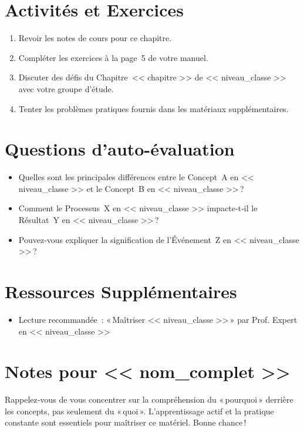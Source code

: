 \documentclass{article}
\begin{document}
	\section*{Activités et Exercices}
	\begin{enumerate}
		\item Revoir les notes de cours pour ce chapitre.
		\item Compléter les exercices à la page 5 de votre manuel.
		\item Discuter des défis du Chapitre << chapitre >> de << niveau_classe >> avec votre groupe d'étude.
		\item Tenter les problèmes pratiques fournis dans les matériaux supplémentaires.
	\end{enumerate}
	
	\section*{Questions d'auto-évaluation}
	\begin{itemize}
		\item Quelles sont les principales différences entre le Concept A en << niveau_classe >> et le Concept B en << niveau_classe >> ?
		\item Comment le Processus X en << niveau_classe >> impacte‑t‑il le Résultat Y en << niveau_classe >> ?
		\item Pouvez‑vous expliquer la signification de l'Événement Z en << niveau_classe >> ?
	\end{itemize}
	
	\section*{Ressources Supplémentaires}
	\begin{itemize}
		\item Lecture recommandée : « Maîtriser << niveau_classe >> » par Prof. Expert en << niveau_classe >>
	\end{itemize}
	
	\section*{Notes pour << nom_complet >>}
	Rappelez‑vous de vous concentrer sur la compréhension du « pourquoi »  
	derrière les concepts, pas seulement du « quoi ».  
	L'apprentissage actif et la pratique constante sont essentiels pour maîtriser ce matériel.  
	Bonne chance !
	
\end{document}
